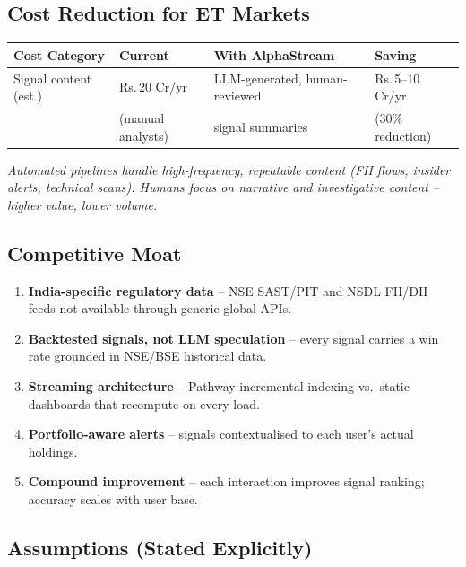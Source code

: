 \documentclass[11pt, a4paper]{article}
\newcommand{\Rs}{Rs.\,}
\begin{document}
\subsection{Cost Reduction for ET Markets}

\begin{center}
\small
\begin{tabular}{L{4cm} L{3.5cm} L{3.5cm} L{2.5cm}}
  \toprule
  \textbf{Cost Category} & \textbf{Current} & \textbf{With AlphaStream} & \textbf{Saving} \\
  \midrule
  Signal content (est.) & \Rs{}20 Cr/yr & LLM-generated, human-reviewed & \Rs{}5--10 Cr/yr \\
  & (manual analysts) & signal summaries & (30\% reduction) \\
  \bottomrule
\end{tabular}
\end{center}

\noindent
\small\textit{Automated pipelines handle high-frequency, repeatable content (FII flows, insider alerts,
technical scans). Humans focus on narrative and investigative content -- higher value, lower volume.}

\subsection{Competitive Moat}

\begin{enumerate}[leftmargin=1.8em, itemsep=3pt]
  \item \textbf{India-specific regulatory data} -- NSE SAST/PIT and NSDL FII/DII feeds
        not available through generic global APIs.
  \item \textbf{Backtested signals, not LLM speculation} -- every signal carries a win rate
        grounded in NSE/BSE historical data.
  \item \textbf{Streaming architecture} -- Pathway incremental indexing vs.\ static
        dashboards that recompute on every load.
  \item \textbf{Portfolio-aware alerts} -- signals contextualised to each user's
        actual holdings.
  \item \textbf{Compound improvement} -- each interaction improves signal ranking;
        accuracy scales with user base.
\end{enumerate}

\subsection{Assumptions (Stated Explicitly)}
\end{document}
